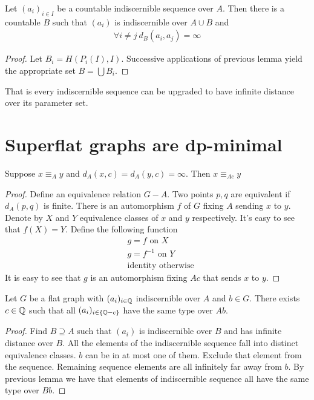 \documentclass{amsart}
\begin{document}
\begin{Corollary}
	Let $(a_i)_{i \in I}$ be a countable indiscernible sequence over $A$. Then there is a countable $B$ such that  $(a_i)$ is indiscernible over $A \cup B$ and
	\begin{align*}
		\forall i \neq j \ d_B(a_i, a_j) = \infty
	\end{align*}
\end{Corollary}

\begin{proof}
	Let $B_i = H(P_i(I), I)$. Successive applications of previous lemma yield the appropriate set $B = \bigcup B_i$.
\end{proof}

That is every indiscernible sequence can be upgraded to have infinite distance over its parameter set.

\section{Superflat graphs are dp-minimal}

\begin{Lemma}
	Suppose $x \equiv_A y$ and $d_A(x, c) = d_A(y, c) = \infty$. Then $x \equiv_{Ac} y$
\end{Lemma}

\begin{proof}
	Define an equivalence relation $G - A$. Two points $p, q$ are equivalent if $d_A(p,q)$ is finite. There is an automorphism $f$ of $G$ fixing $A$ sending $x$ to $y$. Denote by $X$ and $Y$ equivalence classes of $x$ and $y$ respectively. It's easy to see that $f(X) = Y$. Define the following function
	\begin{align*}
		&g = f \text { on } X \\
		&g = f^{-1} \text { on } Y \\
		&\text{identity otherwise}
	\end{align*}
	It is easy to see that $g$ is an automorphism fixing $Ac$ that sends $x$ to $y$.
\end{proof}

\begin{Theorem}
	Let $G$ be a flat graph with $(a_i)_{i\in\mathbb{Q}}$ indiscernible over $A$ and $b \in G$. There exists $c \in \mathbb{Q}$ such that all $(a_i)_{i\in\{\mathbb{Q} - c\}}$ have the same type over $Ab$.
\end{Theorem}

\begin{proof}
	Find $B \supseteq A$ such that $(a_i)$ is indiscernible over $B$ and has infinite distance over $B$. All the elements of the indiscernible sequence fall into distinct equivalence classes. $b$ can be in at most one of them. Exclude that element from the sequence. Remaining sequence elements are all infinitely far away from $b$. By previous lemma we have that elements of indiscernible sequence all have the same type over $Bb$.
\end{proof}
\end{document}
